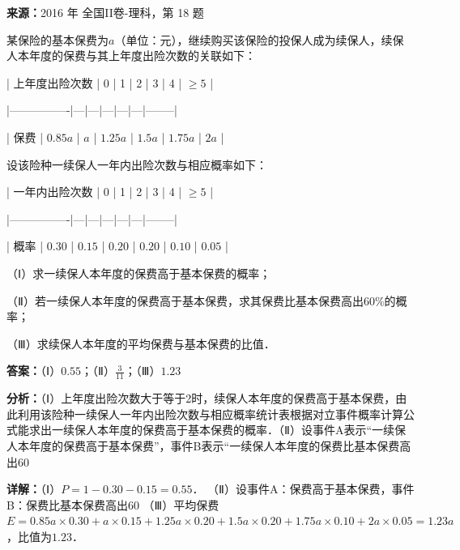 \begin{question}[points=12]
\textbf{来源：}2016 年 全国II卷-理科，第 18 题\par
某保险的基本保费为$a$（单位：元），继续购买该保险的投保人成为续保人，续保人本年度的保费与其上年度出险次数的关联如下：



| 上年度出险次数 | 0 | 1 | 2 | 3 | 4 | $\ge5$ |

|----------------|---|---|---|---|---|--------|

| 保费 | $0.85a$ | $a$ | $1.25a$ | $1.5a$ | $1.75a$ | $2a$ |



设该险种一续保人一年内出险次数与相应概率如下：



| 一年内出险次数 | 0 | 1 | 2 | 3 | 4 | $\ge5$ |

|----------------|---|---|---|---|---|--------|

| 概率 | $0.30$ | $0.15$ | $0.20$ | $0.20$ | $0.10$ | $0.05$ |



（Ⅰ）求一续保人本年度的保费高于基本保费的概率；

（Ⅱ）若一续保人本年度的保费高于基本保费，求其保费比基本保费高出$60\%$的概率；

（Ⅲ）求续保人本年度的平均保费与基本保费的比值．
\begin{solution}
\textbf{答案：}（Ⅰ）$0.55$；（Ⅱ）$\frac{3}{11}$；（Ⅲ）$1.23$

\textbf{分析：}（Ⅰ）上年度出险次数大于等于2时，续保人本年度的保费高于基本保费，由此利用该险种一续保人一年内出险次数与相应概率统计表根据对立事件概率计算公式能求出一续保人本年度的保费高于基本保费的概率．（Ⅱ）设事件A表示“一续保人本年度的保费高于基本保费”，事件B表示“一续保人本年度的保费比基本保费高出60%

\textbf{详解：}（Ⅰ）$P=1-0.30-0.15=0.55$．
（Ⅱ）设事件A：保费高于基本保费，事件B：保费比基本保费高出60%
（Ⅲ）平均保费$E=0.85a\times0.30+a\times0.15+1.25a\times0.20+1.5a\times0.20+1.75a\times0.10+2a\times0.05=1.23a$，比值为$1.23$．
\end{solution}
\end{question}

